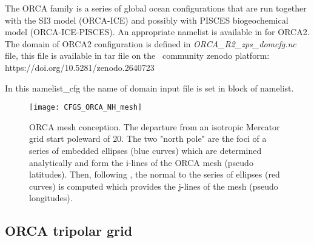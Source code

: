 \documentclass[../main/NEMO_manual]{subfiles}
\begin{document}
The ORCA family is a series of global ocean configurations that are run together with
the SI3 model (ORCA-ICE) and possibly with PISCES biogeochemical model (ORCA-ICE-PISCES).
An appropriate namelist is available in  for ORCA2.
The domain of ORCA2 configuration is defined in \textit{ORCA\_R2\_zps\_domcfg.nc} file,
this file is available in tar file on the \NEMO\ community zenodo platform: \\
https://doi.org/10.5281/zenodo.2640723

In this namelist\_cfg the name of domain input file is set in  block of namelist.

\begin{figure}[!t]
  \centering
  \texttt{[image: CFGS\_ORCA\_NH\_mesh]}
  \caption[ORCA mesh conception]{
    ORCA mesh conception.
    The departure from an isotropic Mercator grid start poleward of 20.
    The two "north pole" are the foci of a series of embedded ellipses (blue curves) which
    are determined analytically and form the i-lines of the ORCA mesh (pseudo latitudes).
    Then, following \citet{madec.imbard_CD96},
    the normal to the series of ellipses (red curves) is computed which
    provides the j-lines of the mesh (pseudo longitudes).}
  \label{fig:CFGS_ORCA_msh}
\end{figure}

\subsection{ORCA tripolar grid}
\label{subsec:CFGS_orca_grid}
\end{document}

